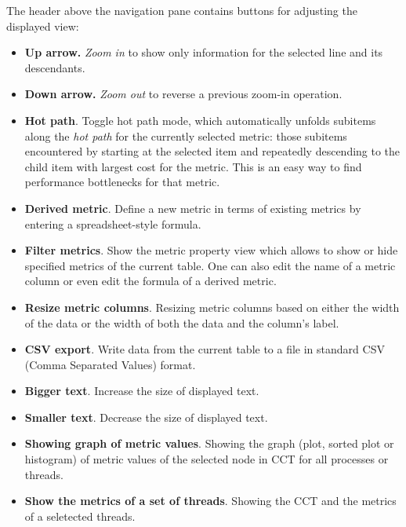 \documentclass[english]{article}
\begin{document}
\begin{itemize}
The header above the navigation pane contains buttons for adjusting the displayed view:

\begin{itemize}

\item \textbf{Up arrow.} \emph{Zoom in} to show only information for the selected line and its descendants.

\item \textbf{Down arrow.} \emph{Zoom out} to reverse a previous zoom-in operation.

\item \textbf{Hot path}. Toggle hot path mode,
which automatically unfolds subitems along the \emph{hot path} for the currently selected metric:
those subitems encountered by starting at the selected item
and repeatedly descending to the child item with largest cost for the metric.
This is an easy way to find performance bottlenecks for that metric.

\item \textbf{Derived metric}. Define a new metric in terms of existing metrics
by entering a spreadsheet-style formula.

\item \textbf{Filter metrics}. Show the metric property view which allows to show or hide specified metrics of the current table.
One can also edit the name of a metric column or even edit the formula of a derived metric.

\item \textbf{Resize metric columns}. Resizing metric columns based on either the width of the data
	or the width of both the data and the column's label.

\item \textbf{CSV export}. Write data from the current table to a file
in standard CSV (Comma Separated Values) format.

\item \textbf{Bigger text}. Increase the size of displayed text.

\item \textbf{Smaller text}. Decrease the size of displayed text.

\item \textbf{Showing graph of metric values}.
Showing the graph (plot, sorted plot or histogram) of metric values of the selected node in CCT for all processes or threads.

\item \textbf{Show the metrics of a set of threads}.
Showing the CCT and the metrics of a seletected threads.




\end{itemize}
\end{itemize}
\end{document}
